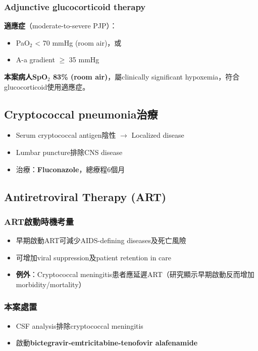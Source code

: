 \documentclass[12pt,a4paper]{article}
\begin{document}
\subsubsection{Adjunctive glucocorticoid therapy}
\textbf{適應症}（moderate-to-severe PJP）：
\begin{itemize}
    \item PaO$_2$ < 70 mmHg (room air)，或
    \item A-a gradient $\geq$ 35 mmHg
\end{itemize}

\begin{importantbox}
\textbf{本案病人SpO$_2$ 83\% (room air)}，屬clinically significant hypoxemia，符合glucocorticoid使用適應症。
\end{importantbox}

\subsection{Cryptococcal pneumonia治療}
\begin{itemize}
    \item Serum cryptococcal antigen陰性 $\rightarrow$ Localized disease
    \item Lumbar puncture排除CNS disease
    \item 治療：\textbf{Fluconazole}，總療程6個月
\end{itemize}

\subsection{Antiretroviral Therapy (ART)}

\subsubsection{ART啟動時機考量}
\begin{itemize}
    \item 早期啟動ART可減少AIDS-defining diseases及死亡風險
    \item 可增加viral suppression及patient retention in care
    \item \textbf{例外}：Cryptococcal meningitis患者應延遲ART（研究顯示早期啟動反而增加morbidity/mortality）
\end{itemize}

\subsubsection{本案處置}
\begin{itemize}
    \item CSF analysis排除cryptococcal meningitis
    \item 啟動\textbf{bictegravir-emtricitabine-tenofovir alafenamide}
\end{itemize}
\end{document}
